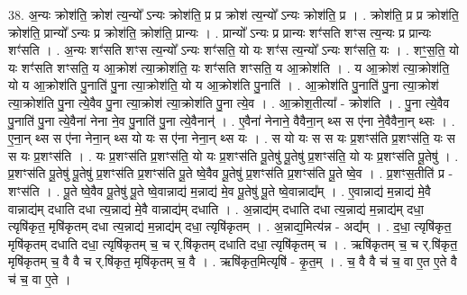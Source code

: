 \documentclass[17pt]{extarticle}
\begin{document}
38. अ॒न्यः क्रोश॑ति॒ क्रोश॑ त्य॒न्यो᳚ ऽन्यः क्रोश॑ति॒ प्र प्र क्रोश॑ त्य॒न्यो᳚ ऽन्यः क्रोश॑ति॒ प्र । . क्रोश॑ति॒ प्र प्र क्रोश॑ति॒ क्रोश॑ति॒ प्रान्यो᳚ ऽन्यः प्र क्रोश॑ति॒ क्रोश॑ति॒ प्रान्यः । . प्रान्यो᳚ ऽन्यः प्र प्रान्यः शꣳ॑सति शꣳस त्य॒न्यः प्र प्रान्यः शꣳ॑सति । . अ॒न्यः शꣳ॑सति शꣳस त्य॒न्यो᳚ ऽन्यः शꣳ॑सति॒ यो यः शꣳ॑स त्य॒न्यो᳚ ऽन्यः शꣳ॑सति॒ यः । . शꣳ॒॒स॒ति॒ यो यः शꣳ॑सति शꣳसति॒ य आ॒क्रोश॑ त्या॒क्रोश॑ति॒ यः शꣳ॑सति शꣳसति॒ य आ॒क्रोश॑ति । . य आ॒क्रोश॑ त्या॒क्रोश॑ति॒ यो य आ॒क्रोश॑ति पु॒नाति॑ पु॒ना त्या॒क्रोश॑ति॒ यो य आ॒क्रोश॑ति पु॒नाति॑ । . आ॒क्रोश॑ति पु॒नाति॑ पु॒ना त्या॒क्रोश॑ त्या॒क्रोश॑ति पु॒ना त्ये॒वैव पु॒ना त्या॒क्रोश॑ त्या॒क्रोश॑ति पु॒ना त्ये॒व । . आ॒क्रोश॒तीत्या᳚ - क्रोश॑ति । . पु॒ना त्ये॒वैव पु॒नाति॑ पु॒ना त्ये॒वैना॑ नेना ने॒व पु॒नाति॑ पु॒ना त्ये॒वैनान्॑ । . ए॒वैना॑ नेनाने॒ वैवैना॒न् थ्स स ए॑ना ने॒वैवैना॒न् थ्सः । . ए॒ना॒न् थ्स स ए॑ना नेना॒न् थ्स यो यः स ए॑ना नेना॒न् थ्स यः । . स यो यः स स यः प्र॒शꣳस॑ति प्र॒शꣳस॑ति॒ यः स स यः प्र॒शꣳस॑ति । . यः प्र॒शꣳस॑ति प्र॒शꣳस॑ति॒ यो यः प्र॒शꣳस॑ति पू॒तेषु॑ पू॒तेषु॑ प्र॒शꣳस॑ति॒ यो यः प्र॒शꣳस॑ति पू॒तेषु॑ । . प्र॒शꣳस॑ति पू॒तेषु॑ पू॒तेषु॑ प्र॒शꣳस॑ति प्र॒शꣳस॑ति पू॒ते ष्वे॒वैव पू॒तेषु॑ प्र॒शꣳस॑ति प्र॒शꣳस॑ति पू॒ते ष्वे॒व । . प्र॒शꣳस॒तीति॑ प्र - शꣳस॑ति । . पू॒ते ष्वे॒वैव पू॒तेषु॑ पू॒ते ष्वे॒वान्नाद्य॑ म॒न्नाद्य॑ मे॒व पू॒तेषु॑ पू॒ते ष्वे॒वान्नाद्य᳚म् । . ए॒वान्नाद्य॑ म॒न्नाद्य॑ मे॒वै वान्नाद्य॑म् दधाति दधा त्य॒न्नाद्य॑ मे॒वै वान्नाद्य॑म् दधाति । . अ॒न्नाद्य॑म् दधाति दधा त्य॒न्नाद्य॑ म॒न्नाद्य॑म् दधा॒ त्यृषि॑कृत॒ मृषि॑कृतम् दधा त्य॒न्नाद्य॑ म॒न्नाद्य॑म् दधा॒ त्यृषि॑कृतम् । . अ॒न्नाद्य॒मित्य॑न्न - अद्य᳚म् । . द॒धा॒ त्यृषि॑कृत॒ मृषि॑कृतम् दधाति दधा॒ त्यृषि॑कृतम् च॒ च र्.षि॑कृतम् दधाति दधा॒ त्यृषि॑कृतम् च । . ऋषि॑कृतम् च॒ च र्.षि॑कृत॒ मृषि॑कृतम् च॒ वै वै च र्.षि॑कृत॒ मृषि॑कृतम् च॒ वै । . ऋषि॑कृत॒मित्यृषि॑ - कृ॒त॒म् । . च॒ वै वै च॑ च॒ वा ए॒त ए॒ते वै च॑ च॒ वा ए॒ते । \newline
\pagebreak
{}
\end{document}
